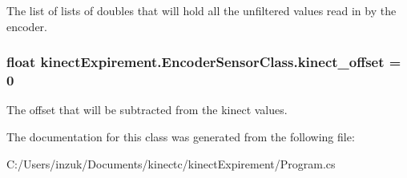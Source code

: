 The list of lists of doubles that will hold all the unfiltered values read in by the encoder. 

\subsubsection[{\texorpdfstring{kinect\+\_\+offset}{kinect_offset}}]{\setlength{\rightskip}{0pt plus 5cm}float kinect\+Expirement.\+Encoder\+Sensor\+Class.\+kinect\+\_\+offset = 0\hspace{0.3cm}{\ttfamily [static]}}\hypertarget{classkinect_expirement_1_1_encoder_sensor_class_a70bb049741404bcfcce7e78a43739e33}{}\label{classkinect_expirement_1_1_encoder_sensor_class_a70bb049741404bcfcce7e78a43739e33}


The offset that will be subtracted from the kinect values. 



The documentation for this class was generated from the following file\+:\begin{DoxyCompactItemize}
\item 
C\+:/\+Users/inzuk/\+Documents/kinectc/kinect\+Expirement/Program.\+cs\end{DoxyCompactItemize}

